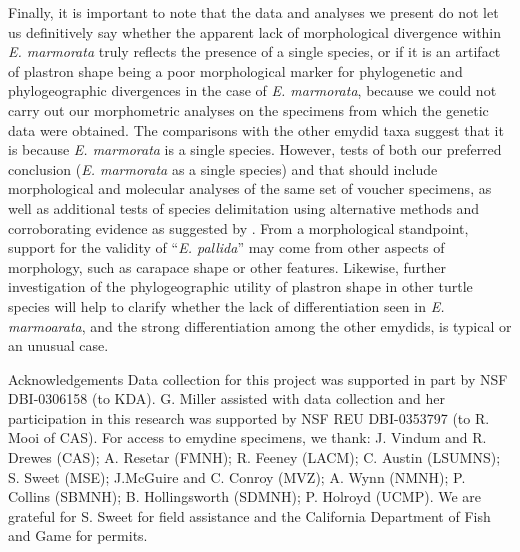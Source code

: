 \documentclass[12pt,letterpaper]{article}
\renewcommand{\section}[1]{%
\bigskip
\begin{center}
\begin{Large}
\normalfont\scshape #1
\medskip
\end{Large}
\end{center}}
\begin{document}
Finally, it is important to note that the data and analyses we present do not let us definitively say whether the apparent lack of morphological divergence within \textit{E. marmorata} truly reflects the presence of a single species, or if it is an artifact of plastron shape being a poor morphological marker for phylogenetic and phylogeographic divergences in the case of \textit{E. marmorata}, because we could not carry out our morphometric analyses on the specimens from which the genetic data were obtained. The comparisons with the other emydid taxa suggest that it is because \textit{E. marmorata} is a single species. However, tests of both our preferred conclusion (\textit{E. marmorata} as a single species) and that \citet{Spinks2014} should include morphological and molecular analyses of the same set of voucher specimens, as well as additional tests of species delimitation using alternative methods and corroborating evidence as suggested by \citet{Carstens2013}. From a morphological standpoint, support for the validity of ``\textit{E. pallida}'' may come from other aspects of morphology, such as carapace shape or other features. Likewise, further investigation of the phylogeographic utility of plastron shape in other turtle species will help to clarify whether the lack of differentiation seen in \textit{E. marmoarata}, and the strong differentiation among the other emydids, is typical or an unusual case.


\section*{Acknowledgements}
Data collection for this project was supported in part by NSF DBI-0306158 (to KDA). G. Miller assisted with data collection and her participation in this research was supported by NSF REU DBI-0353797 (to R. Mooi of CAS). For access to emydine specimens, we thank: J. Vindum and R. Drewes (CAS); A. Resetar (FMNH); R. Feeney (LACM); C. Austin (LSUMNS); S. Sweet (MSE); J.McGuire and C. Conroy (MVZ); A. Wynn (NMNH); P. Collins (SBMNH); B. Hollingsworth (SDMNH); P. Holroyd (UCMP). We are grateful for S. Sweet for field assistance and the California Department of Fish and Game for permits.



\end{document}

